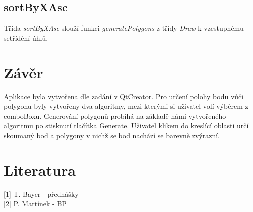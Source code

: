 \documentclass{article}
\begin{document}
\subsection{sortByXAsc}
Třída \emph{sortByXAsc} slouží funkci \emph{generatePolygons} z třídy \emph{Draw} k vzestupnému setřídění úhlů.
\newpage
\section{Závěr}
Aplikace byla vytvořena dle zadání v QtCreator. Pro určení polohy bodu vůči polygonu byly vytvořeny dva algoritmy, mezi kterými si uživatel volí výběrem z comboBoxu. Generování polygonů probíhá na základě námi vytvořeného algoritmu po stisknutí tlačítka Generate. Uživatel klikem do kreslící oblasti určí skoumaný bod a polygony v nichž se bod nachází se barevně zvýrazní.

\newpage
\section{Literatura}

[1] T. Bayer - přednášky \\

[2] P. Martínek - BP

\end{document}
